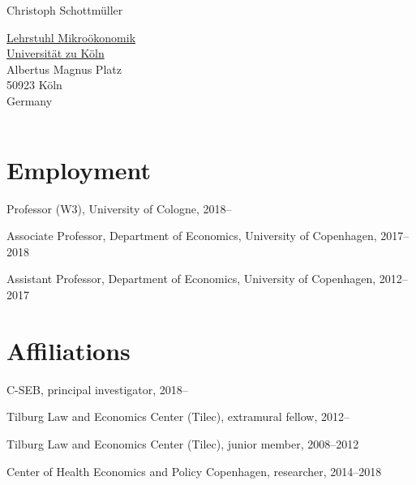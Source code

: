 \documentclass[a4paper]{article}
\def\name{Christoph Schottm\"uller}
\renewenvironment{itemize}{
  \begin{list}{}{
    \setlength{\leftmargin}{1.5em}
  }
}{
  \end{list}
}
\begin{document}
{\huge \name}


\vspace{0.25in}

\begin{minipage}{0.45\linewidth}
  \href{https://schottmueller.github.io/}{Lehrstuhl Mikro\"okonomik} \\
  \href{https://www.wiso.uni-koeln.de/en/en}{Universität zu Köln} \\
  Albertus Magnus Platz\\
  50923 K\"oln\\Germany
\end{minipage}
\hspace*{-.5cm} %
\begin{minipage}{0.45\linewidth}
  \begin{tabular}{ll} 
  \end{tabular}
\end{minipage}


\section*{Employment}

\begin{itemize}
\item Professor (W3), University of Cologne, 2018--
  \item Associate Professor, Department of Economics, University of Copenhagen, 2017--2018
\item Assistant Professor, Department of Economics, University of Copenhagen, 2012--2017
\end{itemize}

\section*{Affiliations}
\begin{itemize}
\item C-SEB, principal investigator, 2018--
\item Tilburg Law and Economics Center (Tilec), extramural fellow, 2012--
\item Tilburg Law and Economics Center (Tilec), junior member, 2008--2012
\item Center of Health Economics and Policy Copenhagen, researcher, 2014--2018
\end{itemize}
\end{document}

